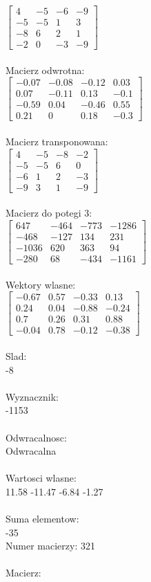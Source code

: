 \documentclass[a4paper,12pt]{article}
\begin{document}
$\begin{bmatrix} 4&-5&-6&-9\\-5&-5&1&3\\-8&6&2&1\\-2&0&-3&-9 \end{bmatrix}$
\\
\\
Macierz odwrotna:\\

$\begin{bmatrix} -0.07&-0.08&-0.12&0.03\\0.07&-0.11&0.13&-0.1\\-0.59&0.04&-0.46&0.55\\0.21&0&0.18&-0.3 \end{bmatrix}$
\\
\\
Macierz transponowana:\\

$\begin{bmatrix} 4&-5&-8&-2\\-5&-5&6&0\\-6&1&2&-3\\-9&3&1&-9 \end{bmatrix}$
\\
\\
Macierz do potegi 3:\\

$\begin{bmatrix} 647&-464&-773&-1286\\-468&-127&134&231\\-1036&620&363&94\\-280&68&-434&-1161 \end{bmatrix}$
\\
\\
Wektory wlasne:\\

$\begin{bmatrix} -0.67&0.57&-0.33&0.13\\0.24&0.04&-0.88&-0.24\\0.7&0.26&0.31&0.88\\-0.04&0.78&-0.12&-0.38 \end{bmatrix}$
\\
\\
Slad:\\
-8
\\
\\
Wyznacznik:\\
-1153
\\
\\
Odwracalnosc:\\
Odwracalna
\\
\\
Wartosci wlasne:\\
11.58 -11.47 -6.84 -1.27
\\
\\
Suma elementow:\\
-35
\\
\newpage
Numer macierzy:
321
\\
\\
Macierz:\\
\end{document}

